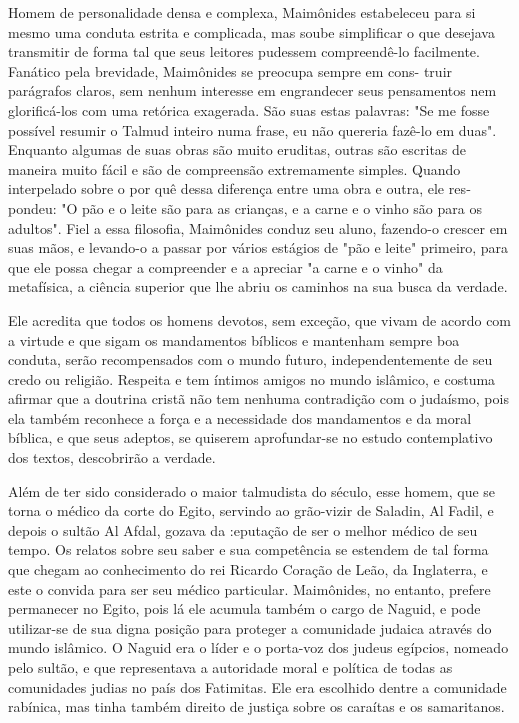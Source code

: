 \begin{itemize}
Homem de personalidade densa e complexa, Maimônides estabele­ceu para si
mesmo uma conduta estrita e complicada, mas soube simplificar o que
desejava transmitir de forma tal que seus leitores pudessem
compreendê-lo facilmente. Fanático pela brevidade, Maimônides se
preocupa sempre em cons-
truir parágrafos claros, sem nenhum interesse em engrandecer seus
pensamen­tos nem glorificá-los com uma retórica exagerada. São suas
estas palavras: "Se me fosse possível resumir o Talmud inteiro numa
frase, eu não quereria fazê-lo em duas". Enquanto algumas de suas obras
são muito eruditas, outras são escri­tas de maneira muito fácil e são de
compreensão extremamente simples. Quan­do interpelado sobre o por quê
dessa diferença entre uma obra e outra, ele res­pondeu: "O pão e o leite
são para as crianças, e a carne e o vinho são para os adultos". Fiel a
essa filosofia, Maimônides conduz seu aluno, fazendo-o crescer em suas
mãos, e levando-o a passar por vários estágios de "pão e leite"
primeiro, para que ele possa chegar a compreender e a apreciar "a carne
e o vinho" da metafísica, a ciência superior que lhe abriu os caminhos
na sua busca da verdade.

Ele acredita que todos os homens devotos, sem exceção, que vivam de
acordo com a virtude e que sigam os mandamentos bíblicos e mantenham
sempre boa conduta, serão recompensados com o mundo futuro,
independen­temente de seu credo ou religião. Respeita e tem íntimos
amigos no mundo islâmico, e costuma afirmar que a doutrina cristã não
tem nenhuma contradi­ção com o judaísmo, pois ela também reconhece a
força e a necessidade dos mandamentos e da moral bíblica, e que seus
adeptos, se quiserem aprofundar-se no estudo contemplativo dos textos,
descobrirão a verdade.

Além de ter sido considerado o maior talmudista do século, esse ho­mem,
que se torna o médico da corte do Egito, servindo ao grão-vizir de
Sala­din, Al Fadil, e depois o sultão Al Afdal, gozava da :eputação de
ser o melhor médico de seu tempo. Os relatos sobre seu saber e sua
competência se esten­dem de tal forma que chegam ao conhecimento do rei
Ricardo Coração de Leão, da Inglaterra, e este o convida para ser seu
médico particular. Maimônides, no entanto, prefere permanecer no Egito,
pois lá ele acumula também o cargo de Naguid, e pode utilizar-se de sua
digna posição para proteger a comunidade ju­daica através do mundo
islâmico. O Naguid era o líder e o porta-voz dos judeus egípcios,
nomeado pelo sultão, e que representava a autoridade moral e políti­ca
de todas as comunidades judias no país dos Fatimitas. Ele era escolhido
den­tre a comunidade rabínica, mas tinha também direito de justiça sobre
os caraí­tas e os samaritanos.


\end{itemize}
